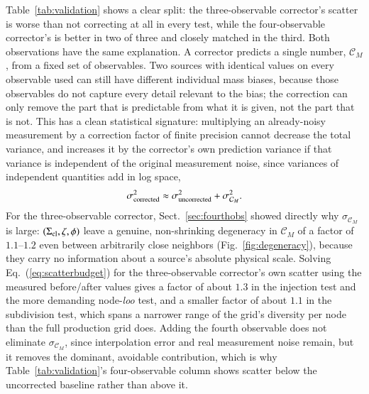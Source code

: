 \documentclass{aa}
\newcommand{\Scloud}{\Sigma_{\rm cl}}
\newcommand{\CM}{\mathcal{C}_{M}}
\begin{document}
Table~\ref{tab:validation} shows a clear split: the three-observable
corrector's scatter is worse than not correcting at all in every test, while
the four-observable corrector's is better in two of three and closely
matched in the third. Both observations have the same explanation. A
corrector predicts a single number, $\CM$, from a fixed set of
observables. Two sources with identical values on every observable used
can still have different individual mass biases, because those observables
do not capture every detail relevant to the bias; the correction can only
remove the part that is predictable from what it is given, not the part
that is not. This has a clean statistical signature: multiplying an
already-noisy measurement by a correction factor of finite precision
cannot decrease the total variance, and increases it by the corrector's
own prediction variance if that variance is independent of the original
measurement noise, since variances of independent quantities add in log
space,
\begin{equation}
  \sigma_{\rm corrected}^2 \approx \sigma_{\rm uncorrected}^2
    + \sigma_{\CM}^2 .
  \label{eq:scatterbudget}
\end{equation}
For the three-observable corrector, Sect.~\ref{sec:fourthobs} showed
directly why $\sigma_{\CM}$ is large: $(\Scloud,\zeta,
\phi)$ leave a genuine, non-shrinking degeneracy in $\CM$ of a
factor of $1.1$--$1.2$ even between arbitrarily close neighbors
(Fig.~\ref{fig:degeneracy}), because they carry no information about a
source's absolute physical scale. Solving Eq.~(\ref{eq:scatterbudget}) for
the three-observable corrector's own scatter using the measured
before/after values gives a factor of about $1.3$ in the injection test
and the more demanding node-\emph{loo} test, and a smaller factor of about
$1.1$ in the subdivision test, which spans a narrower range of the grid's
diversity per node than the full production grid does. Adding the fourth
observable does not eliminate $\sigma_{\CM}$, since interpolation error
and real measurement noise remain, but it removes the dominant, avoidable
contribution, which is why Table~\ref{tab:validation}'s four-observable
column shows scatter below the uncorrected baseline rather than above it.
\end{document}
